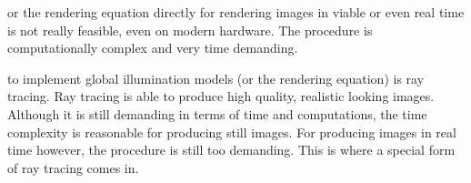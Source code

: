 \documentclass[%
    a4paper,    %
    justified,  %
    nobib,      %
    openany     %
]{tufte-book}
\begin{document}

 or the rendering equation
directly for rendering images in viable or even real time is not really
feasible, even on modern hardware. The procedure is computationally complex and
very time demanding.

 to implement global illumination models (or
the rendering equation) is ray tracing. Ray tracing is able to produce high
quality, realistic looking images. Although it is still demanding in terms of
time and computations, the time complexity is reasonable for producing still
images. For producing images in real time however, the procedure is still too
demanding. This is where a special form of ray tracing comes in.
\end{document}
